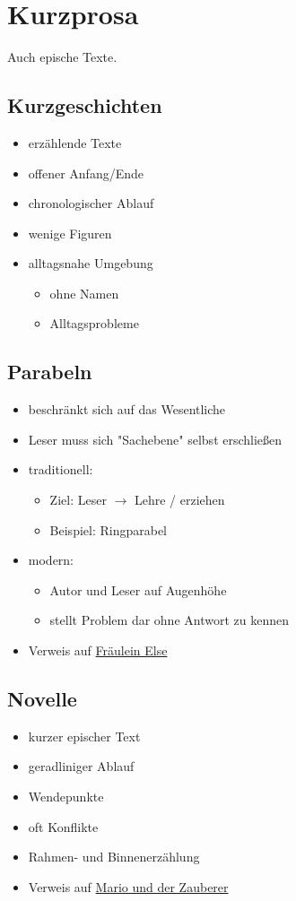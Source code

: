 
\section{Kurzprosa}
Auch epische Texte.

\subsection{Kurzgeschichten}
\begin{itemize}
    \item erzählende Texte
    \item offener Anfang/Ende
    \item chronologischer Ablauf
    \item wenige Figuren
    \item alltagsnahe Umgebung
    \begin{itemize}
        \item ohne Namen
        \item Alltagsprobleme
    \end{itemize}
\end{itemize}


\subsection{Parabeln}
\begin{itemize}
    \item beschränkt sich auf das Wesentliche
    \item Leser muss sich "Sachebene" selbst erschließen
    \item traditionell:
    \begin{itemize}
        \item Ziel: Leser $\rightarrow$ Lehre / erziehen
        \item Beispiel: Ringparabel
    \end{itemize}
    \item modern:
    \begin{itemize}
        \item Autor und Leser auf Augenhöhe
        \item stellt Problem dar ohne Antwort zu kennen
    \end{itemize}
    \item Verweis auf \hyperref[sec:frauleinelse]{Fräulein Else}
\end{itemize}


\subsection{Novelle}
\begin{itemize}
    \item kurzer epischer Text
    \item geradliniger Ablauf
    \item Wendepunkte
    \item oft Konflikte
    \item Rahmen- und Binnenerzählung
    \item Verweis auf \hyperref[sec:mario]{Mario und der Zauberer}
\end{itemize}
